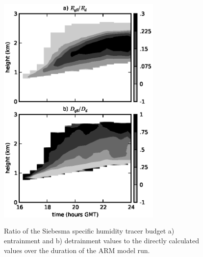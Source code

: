 \documentclass[12pt]{article}
\begin{document}
\begin{figure}[t]
  \noindent
  \includegraphics[width=19pc]{./figures/entrainment_ratio_variability}\\
  \caption{Ratio of the Siebesma specific humidity tracer budget a) entrainment
  and b) detrainment values to the directly calculated values over the duration
  of the ARM model run.}
  \label{fig:entrainment_ratio_variability}
\end{figure}
\end{document}
